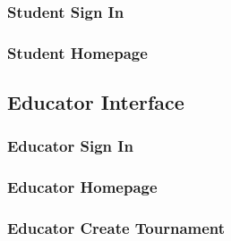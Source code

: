 \subsubsection{Student Sign In}
\subsubsection{Student Homepage}

\subsection{Educator Interface}
\subsubsection{Educator Sign In}
\subsubsection{Educator Homepage}
\subsubsection{Educator Create Tournament}
